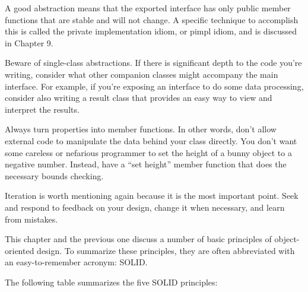 A good abstraction means that the exported interface has only public member functions that are stable and will not change. A specific technique to accomplish this is called the private implementation idiom, or pimpl idiom, and is discussed in Chapter 9.

Beware of single-class abstractions. If there is significant depth to the code you’re writing, consider what other companion classes might accompany the main interface. For example, if you’re exposing an interface to do some data processing, consider also writing a result class that provides an easy way to view and interpret the results.

Always turn properties into member functions. In other words, don’t allow external code to manipulate the data behind your class directly. You don’t want some careless or nefarious programmer to set the height of a bunny object to a negative number. Instead, have a “set height” member function that does the necessary bounds checking.

Iteration is worth mentioning again because it is the most important point. Seek and respond to feedback on your design, change it when necessary, and learn from mistakes.


This chapter and the previous one discuss a number of basic principles of object-oriented design. To summarize these principles, they are often abbreviated with an easy-to-remember acronym: SOLID.

The following table summarizes the five SOLID principles:

